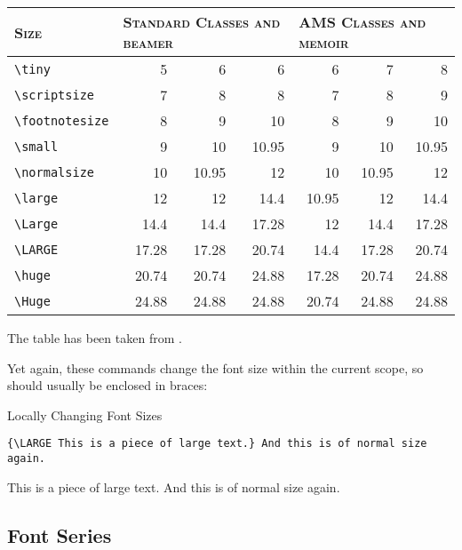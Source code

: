 \documentclass[a4paper,oneside,11pt]{article}
\newcommand\comm[1]{\texttt{\textbackslash#1}}
\begin{document}
\begin{center}
    \begin{tabular}{lrrrrrr}
        \toprule
        \textsc{Size} &
        \multicolumn{3}{l}{\textsc{Standard Classes and beamer}} &
        \multicolumn{3}{l}{\textsc{AMS Classes and memoir}} \\
        \midrule
        \comm{tiny}         &  5    &  6     & 6     & 6     & 7     & 8     \\
        \comm{scriptsize}   &  7    &  8     & 8     & 7     & 8     & 9     \\
        \comm{footnotesize} &  8    &  9     & 10    & 8     & 9     & 10    \\
        \comm{small}        &  9    &  10    & 10.95 & 9     & 10    & 10.95 \\
        \comm{normalsize}   & 10    &  10.95 & 12    & 10    & 10.95 & 12    \\
        \comm{large}        & 12    &  12    & 14.4  & 10.95 & 12    & 14.4  \\
        \comm{Large}        & 14.4  &  14.4  & 17.28 & 12    & 14.4  & 17.28 \\
        \comm{LARGE}        & 17.28 &  17.28 & 20.74 & 14.4  & 17.28 & 20.74 \\
        \comm{huge}         & 20.74 &  20.74 & 24.88 & 17.28 & 20.74 & 24.88 \\
        \comm{Huge}         & 24.88 &  24.88 & 24.88 & 20.74 & 24.88 & 24.88 \\
        \bottomrule
    \end{tabular}
\end{center}

The table has been taken from \cite{wikibooks:fonts}.

Yet again, these commands change the font size within the current scope, so should
usually be enclosed in braces:

\begin{titled-frame}
{\textsf{Locally Changing Font Sizes}}
\vspace{-1em}
\begin{verbatim}
{\LARGE This is a piece of large text.} And this is of normal size again.
\end{verbatim}
{\LARGE This is a piece of large text.} And this is of normal size again.
\end{titled-frame}

\subsection{Font Series}
\label{subsec:font-series}
\end{document}

